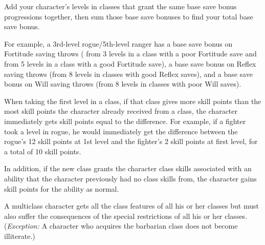  Add your character's levels in classes that grant
the same base save bonus progressions together, then sum those
base save bonuses to find your total base save bonus.

\par For example, a 3rd-level rogue/5th-level ranger has a  base save bonus on Fortitude saving throws ( from 3 levels in a class with a poor Fortitude save and  from 5 levels in a class with a good Fortitude save), a  base save bonus on Reflex saving throws (from 8 levels in classes with good Reflex saves), and a  base save bonus on Will saving throws (from 8 levels in classes with poor Will saves).

 When taking the first level in a class, if that class gives more skill points than the most skill points the character already received from a class, the character immediately gets skill points equal to the difference. For example, if a fighter took a level in rogue, he would immediately get the difference between the rogue's 12 skill points at 1st level and the fighter's 2 skill points at first level, for a total of 10 skill points.

\par In addition, if the new class grants the character class skills associated with an ability that the character previously had no class skills from, the character gains skill points for the ability as normal.

 A multiclass character gets all the class features
of all his or her classes but must also suffer the consequences of the
special restrictions of all his or her classes. (\emph{Exception:} A character
who acquires the barbarian class does not become illiterate.)

